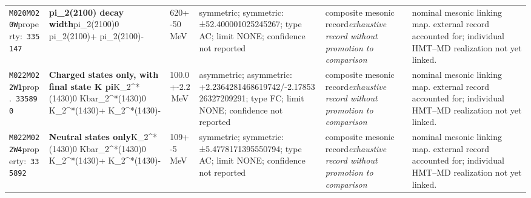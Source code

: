 \begin{landscape}
\begin{longtable}{L{1.85cm}L{4.45cm}L{2.35cm}L{4.05cm}L{3.35cm}L{7.15cm}}
\texttt{M020}\newline \texttt{M020W}\newline property:\ \texttt{335147} & \textbf{pi\_\allowbreak{}2(2100) decay width}\newline pi\_\allowbreak{}2(2100)0 \textbar{}\allowbreak{} pi\_\allowbreak{}2(2100)+ \textbar{}\allowbreak{} pi\_\allowbreak{}2(2100)- & 620+-50\,MeV & symmetric; symmetric: ±52.400001025245267; type AC; limit NONE; confidence not reported & composite mesonic record\newline \emph{exhaustive record without promotion to comparison} & nominal mesonic linking map. external record accounted for; individual HMT--MD realization not yet linked. \\
\texttt{M022}\newline \texttt{M022W1}\newline prop.\ \texttt{335890} & \textbf{Charged states only, with final state K pi}\newline K\_\allowbreak{}2\textasciicircum{}*(1430)0 \textbar{}\allowbreak{} Kbar\_\allowbreak{}2\textasciicircum{}*(1430)0 \textbar{}\allowbreak{} K\_\allowbreak{}2\textasciicircum{}*(1430)+ \textbar{}\allowbreak{} K\_\allowbreak{}2\textasciicircum{}*(1430)- & 100.0+-2.2\,MeV & asymmetric; asymmetric: +2.2364281468619742/-2.1785326327209291; type FC; limit NONE; confidence not reported & composite mesonic record\newline \emph{exhaustive record without promotion to comparison} & nominal mesonic linking map. external record accounted for; individual HMT--MD realization not yet linked. \\
\texttt{M022}\newline \texttt{M022W4}\newline property:\ \texttt{335892} & \textbf{Neutral states only}\newline K\_\allowbreak{}2\textasciicircum{}*(1430)0 \textbar{}\allowbreak{} Kbar\_\allowbreak{}2\textasciicircum{}*(1430)0 \textbar{}\allowbreak{} K\_\allowbreak{}2\textasciicircum{}*(1430)+ \textbar{}\allowbreak{} K\_\allowbreak{}2\textasciicircum{}*(1430)- & 109+-5\,MeV & symmetric; symmetric: ±5.4778171395550794; type AC; limit NONE; confidence not reported & composite mesonic record\newline \emph{exhaustive record without promotion to comparison} & nominal mesonic linking map. external record accounted for; individual HMT--MD realization not yet linked. \\

\end{longtable}
\end{landscape}
